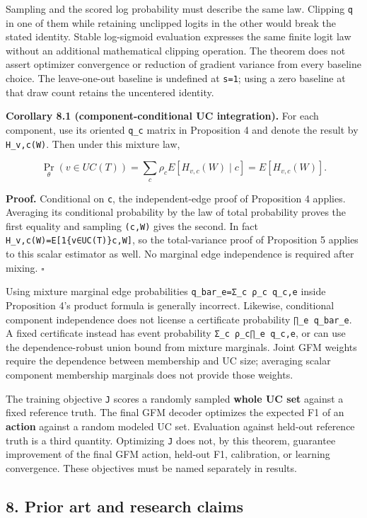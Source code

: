 \documentclass[
  11pt,
]{article}
\begin{document}
Sampling and the scored log probability must describe the same law.
Clipping \texttt{q} in one of them while retaining unclipped logits in
the other would break the stated identity. Stable log-sigmoid evaluation
expresses the same finite logit law without an additional mathematical
clipping operation. The theorem does not assert optimizer convergence or
reduction of gradient variance from every baseline choice. The
leave-one-out baseline is undefined at \texttt{s=1}; using a zero
baseline at that draw count retains the uncentered identity.

\textbf{Corollary 8.1 (component-conditional UC integration).} For each
component, use its oriented \texttt{q\_c} matrix in Proposition 4 and
denote the result by \texttt{H\_v,c(W)}. Then under this mixture law,

\[
\Pr_\theta(v\in UC(T))=
\sum_c\rho_c E[H_{v,c}(W)\mid c]
=E[H_{v,c}(W)].
\]

\textbf{Proof.} Conditional on \texttt{c}, the independent-edge proof of
Proposition 4 applies. Averaging its conditional probability by the law
of total probability proves the first equality and sampling
\texttt{(c,W)} gives the second. In fact
\texttt{H\_v,c(W)=E{[}1\{v∈UC(T)\}\textbar{}c,W{]}}, so the
total-variance proof of Proposition 5 applies to this scalar estimator
as well. No marginal edge independence is required after mixing.
\(\square\)

Using mixture marginal edge probabilities
\texttt{q\_bar\_e=Σ\_c\ ρ\_c\ q\_c,e} inside Proposition 4's product
formula is generally incorrect. Likewise, conditional component
independence does not license a certificate probability
\texttt{∏\_e\ q\_bar\_e}. A fixed certificate instead has event
probability \texttt{Σ\_c\ ρ\_c∏\_e\ q\_c,e}, or can use the
dependence-robust union bound from mixture marginals. Joint GFM weights
require the dependence between membership and UC size; averaging scalar
component membership marginals does not provide those weights.

The training objective \texttt{J} scores a randomly sampled
\textbf{whole UC set} against a fixed reference truth. The final GFM
decoder optimizes the expected F1 of an \textbf{action} against a random
modeled UC set. Evaluation against held-out reference truth is a third
quantity. Optimizing \texttt{J} does not, by this theorem, guarantee
improvement of the final GFM action, held-out F1, calibration, or
learning convergence. These objectives must be named separately in
results.

\hypertarget{prior-art-and-research-claims}{%
\subsection{8. Prior art and research
claims}\label{prior-art-and-research-claims}}
\end{document}
